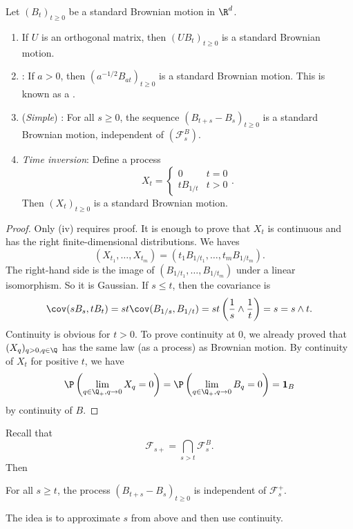 \documentclass[a4paper]{article}
\begin{document}
\begin{prop}
  Let $(B_t)_{t \geq 0}$ be a standard Brownian motion in $\R^d$.
  \begin{enumerate}
    \item If $U$ is an orthogonal matrix, then $(UB_t)_{t \geq 0}$ is a standard Brownian motion.
    \item {}: If $a > 0$, then $(a^{-1/2} B_{at})_{t \geq 0}$ is a standard Brownian motion. This is known as a .
    \item (\emph{Simple}) : For all $s \geq 0$, the sequence $(B_{t + s} - B_s)_{t \geq 0}$ is a standard Brownian motion, independent of $(\mathcal{F}_s^B)$.
    \item \emph{Time inversion}: Define a process
      \[
        X_t =
        \begin{cases}
          0 & t = 0\\
          t B_{1/t} & t > 0
        \end{cases}.
      \]
      Then $(X_t)_{t \geq 0}$ is a standard Brownian motion.
  \end{enumerate}
\end{prop}

\begin{proof}
  Only (iv) requires proof. It is enough to prove that $X_t$ is continuous and has the right finite-dimensional distributions. We haves
  \[
    (X_{t_1}, \ldots, X_{t_m}) = (t_1 B_{1/t_1}, \ldots, t_m B_{1/t_m}).
  \]
  The right-hand side is the image of $(B_{1/t_1}, \ldots, B_{1/t_m})$ under a linear isomorphism. So it is Gaussian. If $s \leq t$, then the covariance is
  \[
    \cov(s B_s, t B_t) = st \cov(B_{1/s}, B_{1/t}) = st \left(\frac{1}{s} \wedge \frac{1}{t}\right) = s = s \wedge t.
  \]
  Continuity is obvious for $t > 0$. To prove continuity at $0$, we already proved that $(X_q)_{q > 0, q \in \Q}$ has the same law (as a process) as Brownian motion. By continuity of $X_t$ for positive $t$, we have
  \[
    \P \left(\lim_{q \in \Q_+, q \to 0} X_q = 0\right) = \P \left(\lim_{q \in \Q_+, q \to 0} B_q = 0\right) = \mathbf{1}_B
  \]
  by continuity of $B$.
\end{proof}

Recall that
\[
  \mathcal{F}_{s+} = \bigcap_{s > t} \mathcal{F}_s^B.
\]
Then
\begin{thm}
  For all $s \geq t$, the process $(B_{t + s} - B_s)_{t \geq 0}$ is independent of $\mathcal{F}_s^+$.
\end{thm}
The idea is to approximate $s$ from above and then use continuity.
\end{document}
